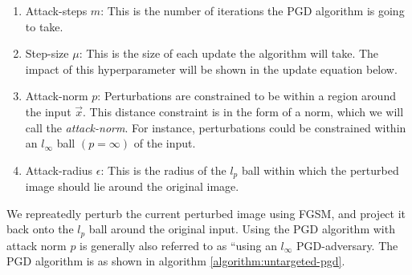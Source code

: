 \documentclass{ociamthesis}
\begin{document}
\begin{enumerate}
    \item Attack-steps $m$: This is the number of iterations the PGD algorithm
    is going to take.
    \item Step-size $\mu$: This is the size of each update the algorithm will
    take. The impact of this hyperparameter will be shown in the update equation
    below.
    \item Attack-norm $p$: Perturbations are constrained to be within a region
    around the input $\vec{x}$. This distance constraint is in the form of a
    norm, which we will call the \emph{attack-norm}. For instance, perturbations
    could be constrained within an $l_\infty$ ball $(p=\infty)$ of the input.
    \item Attack-radius $\epsilon$: This is the radius of the $l_p$ ball within
    which the perturbed image should lie around the original image.
\end{enumerate}
We repreatedly perturb the current perturbed image using FGSM, and project it
back onto the $l_p$ ball around the original input. Using the PGD algorithm with
attack norm $p$ is generally also referred to as ``using an $l_\infty$
PGD-adversary. The PGD algorithm is as shown in algorithm
\ref{algorithm:untargeted-pgd}.
\end{document}

